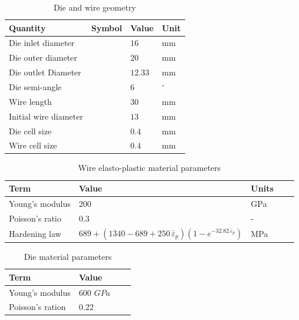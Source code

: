 \documentclass[sn-mathphys,Numbered,draft]{sn-jnl}%
\begin{document}
\begin{table}[htb]
	\centering
		\begin{tabular}{llll} \hline
		    Quantity & Symbol & Value & Unit \\
		    \hline
		    Die inlet diameter &  & $16$ & mm \\
		    Die outer diameter & & $20$ & mm \\
	      	    Die outlet Diameter &  & $12.33$ & mm \\
	            Die semi-angle & &  $6$ & $^{\circ}$ \\
		    Wire length & & $30$ & mm \\
		    Initial wire diameter & & $13$ & mm \\
      	            Die cell size & & $0.4$ & mm \\
	            Wire cell size & & $0.4$ & mm \\
			\hline
		\end{tabular}
	\caption{Die and wire geometry}
	\label{tab:material_properties}
\end{table}


\begin{table}[htb]
	\centering
		\begin{tabular}{lllll} \hline
			Term  & Value & Units  \\ \hline 
            Young's modulus & 200  & GPa \\
			Poisson's ratio & 0.3 & -  \\
   		Hardening law & $689+(1340-689+250\,\bar{\varepsilon}_p)(1-e^{-32.82\,\bar{\varepsilon}_p})$ & MPa  \\
			\hline
		\end{tabular}
	\caption{Wire elasto-plastic material parameters}
	\label{tab:material_properties}
\end{table}

\begin{table}[htb]
	\centering
		\begin{tabular}{llll} \hline
			Term  & Value  \\ \hline 
            Young's modulus & 600 $GPa$ \\
			Poisson's ration & 0.22  \\
			\hline
		\end{tabular}
	\caption{Die material parameters}
	\label{tab:material_properties}
\end{table}


\FloatBarrier
\end{document}
